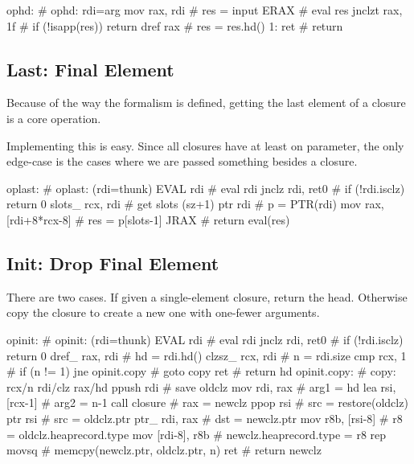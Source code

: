 \begin{asm}
ophd:                                       # ophd: rdi=arg
	mov	rax, rdi                    #   res = input
	ERAX                                #   eval res
	jnclzt	rax, 1f                     #   if (!isapp(res)) return
	dref	rax                         #   res = res.hd()
1:	ret                                 #   return
\end{asm}

\subsection{Last: Final Element}

Because of the way the formalism is defined, getting the last element
of a closure is a core operation.

Implementing this is easy.  Since all closures have at least on parameter,
the only edge-case is the cases where we are passed something besides
a closure.

\begin{asm}
oplast:                                     # oplast: (rdi=thunk)
	EVAL	rdi                         #   eval rdi
	jnclz	rdi, ret0                   #   if (!rdi.isclz) return 0
	slots_	rcx, rdi                    #   get slots (sz+1)
	ptr	rdi                         #   p = PTR(rdi)
	mov	rax, [rdi+8*rcx-8]          #   res = p[slots-1]
	JRAX                                #   return eval(res)
\end{asm}


\subsection{Init: Drop Final Element}

There are two cases.  If given a single-element closure, return the head.
Otherwise copy the closure to create a new one with one-fewer arguments.

\begin{asm}
opinit:                                     # opinit: (rdi=thunk)
	EVAL	rdi                         #   eval rdi
	jnclz	rdi, ret0                   #   if (!rdi.isclz) return 0
	dref_	rax, rdi                    #   hd = rdi.hd()
	clzsz_	rcx, rdi                    #   n = rdi.size
	cmp	rcx, 1                      #   if (n != 1)
	jne	opinit.copy                 #     goto copy
	ret                                 #   return hd
opinit.copy:                                # copy: rcx/n rdi/clz rax/hd
	ppush	rdi                         #   save oldclz
	mov	rdi, rax                    #   arg1 = hd
	lea	rsi, [rcx-1]                #   arg2 = n-1
	call	closure                     #   rax = newclz
	ppop	rsi                         #   src = restore(oldclz)
	ptr	rsi                         #   src = oldclz.ptr
	ptr_	rdi, rax                    #   dst = newclz.ptr
	mov	r8b, [rsi-8]                #   r8 = oldclz.heaprecord.type
	mov	[rdi-8], r8b                #   newclz.heaprecord.type = r8
	rep	movsq                       #   memcpy(newclz.ptr, oldclz.ptr, n)
	ret                                 #   return newclz
\end{asm}


